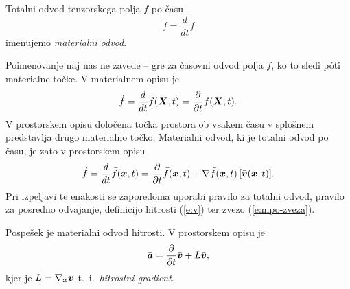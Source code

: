 \begin{definicija}
	Totalni odvod tenzorskega polja $f$ po času
	\[
		\dot{f}=\frac{d}{dt}f
	\]
	imenujemo \emph{materialni odvod}.
\end{definicija}
Poimenovanje naj nas ne zavede -- gre za časovni odvod polja $f$, ko to sledi póti materialne točke.
V materialnem opisu je
\[ \dot{f}=\frac{d}{dt}f(\boldsymbol X,t)=\frac{\partial}{\partial t}f(\boldsymbol X,t). \]
V prostorskem opisu določena točka prostora ob vsakem času v splošnem predstavlja
drugo materialno točko. Materialni odvod, ki je totalni odvod po času, je zato v prostorskem opisu
\[
	\dot{f}=\frac{d}{dt}\bar{f}(\boldsymbol x,t) = \frac{\partial}{\partial t}\bar{f}(\boldsymbol x,t) +
	\nabla\bar{f}(\boldsymbol x,t)\,[\bar{\boldsymbol v}(\boldsymbol x,t)].
\]
Pri izpeljavi te enakosti se zaporedoma uporabi pravilo za totalni odvod, pravilo za posredno odvajanje,
definicijo hitrosti (\ref{e:v}) ter zvezo (\ref{e:mpo-zveza}).
\begin{primer}
	Pospešek je materialni odvod hitrosti. V prostorskem opisu je
	\[ \bar{\boldsymbol a}=\frac{\partial}{\partial t}\bar{\boldsymbol v}+L\bar{\boldsymbol v}, \]
	kjer je $L=\nabla_{\boldsymbol x}\boldsymbol v$ t.~i.~\emph{hitrostni gradient}.
\end{primer}

